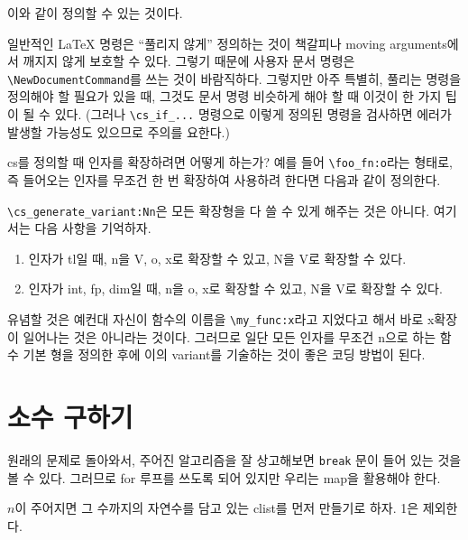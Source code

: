 \documentclass[a4paper,amsmath]{oblivoir}
\begin{document}
이와 같이 정의할 수 있는 것이다. 

일반적인 \LaTeX{} 명령은 “풀리지 않게” 정의하는 것이 책갈피나 moving arguments에서 깨지지 않게 보호할 수 있다. 그렇기 때문에 사용자 문서 명령은 \verb|\NewDocumentCommand|를 쓰는 것이 바람직하다.
그렇지만 아주 특별히, 풀리는 명령을 정의해야 할 필요가 있을 때, 그것도 문서 명령 비슷하게 해야 할 때 이것이 한 가지 팁이 될 수 있다. (그러나 \verb|\cs_if_...| 명령으로 이렇게 정의된 명령을 검사하면 에러가 발생할 가능성도 있으므로 주의를 요한다.)

\bigskip

cs를 정의할 때 인자를 확장하려면 어떻게 하는가? 예를 들어 \verb|\foo_fn:o|라는 형태로, 즉 들어오는 인자를 무조건 한 번 확장하여 사용하려 한다면 다음과 같이 정의한다.


\verb|\cs_generate_variant:Nn|은 모든 확장형을 다 쓸 수 있게 해주는 것은 아니다. 여기서는 다음 사항을 기억하자.

\begin{enumerate}[(1)] \firmlist
\item 인자가 tl일 때, n을 V, o, x로 확장할 수 있고, N을 V로 확장할 수 있다.
\item 인자가 int, fp, dim일 때, n을 o, x로 확장할 수 있고, N을 V로 확장할 수 있다.
\end{enumerate}

유념할 것은 예컨대 자신이 함수의 이름을 \verb|\my_func:x|라고 지었다고 해서 바로 x확장이 일어나는 것은 아니라는 것이다. 그러므로 일단 모든 인자를 무조건 n으로 하는 함수 기본 형을 정의한 후에 이의 variant를 기술하는 것이 좋은 코딩 방법이 된다.

\section{소수 구하기}

원래의 문제로 돌아와서, 주어진 알고리즘을 잘 상고해보면 \verb|break| 문이 들어 있는 것을 볼 수 있다.
그러므로 for 루프를 쓰도록 되어 있지만 우리는 map을 활용해야 한다.

$n$이 주어지면 그 수까지의 자연수를 담고 있는 clist를 먼저 만들기로 하자. 1은 제외한다.

\end{document}
